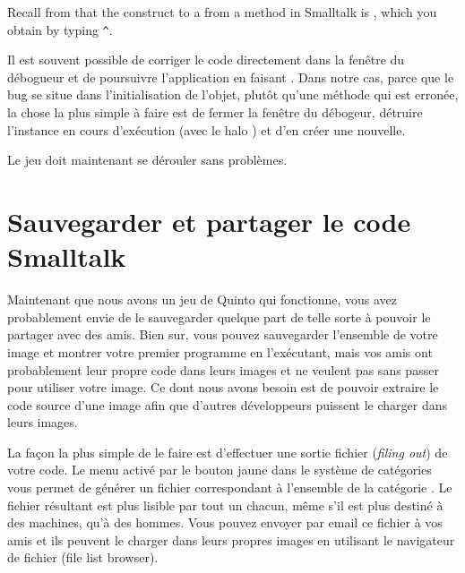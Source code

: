 \documentclass[a4paper,10pt,twoside]{book}
\begin{document}
\noindent
Recall from  that the construct to  a  from a method in Smalltalk is \ct{^}, which you obtain by typing \verb|^|.

Il est souvent possible de corriger le code directement dans la fenêtre du débogueur et de poursuivre l'application en faisant .
Dans notre cas, parce que le bug se situe dans l'initialisation de l'objet, plutôt qu'une méthode qui est erronée, la chose la plus simple à faire est de fermer la fenêtre du débogeur, détruire l'instance en cours d'exécution (avec le halo ) et d'en créer une nouvelle.


Le jeu doit maintenant se dérouler sans problèmes.


\section{Sauvegarder et partager le code Smalltalk}
\label{sec:Monticello}

Maintenant que nous avons un jeu de Quinto qui fonctionne, vous avez probablement envie de le sauvegarder quelque part de telle sorte à pouvoir le partager avec des amis. Bien sur, vous pouvez sauvegarder l'ensemble de votre image \squeak et montrer votre premier programme en l'exécutant, mais vos amis ont probablement leur propre code dans leurs images et ne veulent pas sans passer pour utiliser votre image.
Ce dont nous avons besoin est de pouvoir extraire le code source d'une image \squeak afin que d'autres développeurs puissent le charger dans leurs images.

La façon la plus simple de le faire est d'effectuer une sortie fichier (\emph{filing out}) de votre code. Le menu activé par le bouton jaune dans le système de catégories vous permet de générer un fichier correspondant à l'ensemble de la catégorie .
Le fichier résultant est plus lisible par tout un chacun, même s'il est plus destiné à des machines, qu'à des hommes.
Vous pouvez envoyer par email ce fichier à vos amis et ils peuvent le charger dans leurs propres images \squeak en utilisant le navigateur de fichier (file list browser).
\end{document}
